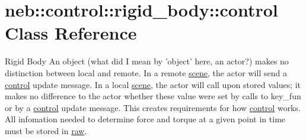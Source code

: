 \hypertarget{classneb_1_1control_1_1rigid__body_1_1control}{
\section{neb::control::rigid\_\-body::control Class Reference}
\label{classneb_1_1control_1_1rigid__body_1_1control}
}


Rigid Body An object (what did I mean by 'object' here, an actor?) makes no distinction between local and remote. In a remote \hyperlink{namespaceneb_1_1scene}{scene}, the actor will send a \hyperlink{classneb_1_1control_1_1rigid__body_1_1control}{control} update message. In a local \hyperlink{namespaceneb_1_1scene}{scene}, the actor will call upon stored values; it makes no difference to the actor whether these value were set by calls to key\_\-fun or by a \hyperlink{classneb_1_1control_1_1rigid__body_1_1control}{control} update message. This creates requirements for how \hyperlink{classneb_1_1control_1_1rigid__body_1_1control}{control} works. All infomation needed to determine force and torque at a given point in time must be stored in \hyperlink{classneb_1_1control_1_1rigid__body_1_1raw}{raw}.  


